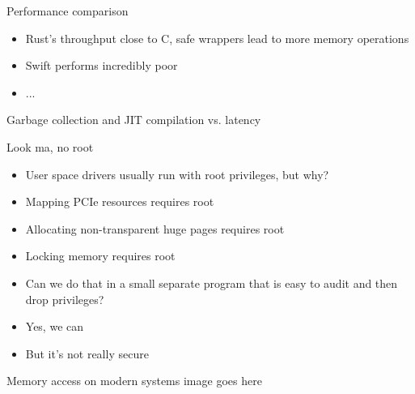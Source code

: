 \documentclass[NET,english,aspectratio=169,notitleframe]{tumbeamer}
\begin{document}
\begin{frame}{Performance comparison}
\begin{itemize}
\item Rust's throughput close to C, safe wrappers lead to more memory operations
\item Swift performs incredibly poor
\item ...
\end{itemize}
\end{frame}

\begin{frame}{Garbage collection and JIT compilation vs. latency}
\end{frame}

\begin{frame}{Look ma, no root}
\begin{itemize}
\item User space drivers usually run with root privileges, but why?
\pause
\vspace{1em}
\item Mapping PCIe resources requires root
\item Allocating non-transparent huge pages requires root
\item Locking memory requires root
\vspace{1em}
\item Can we do that in a small separate program that is easy to audit and then drop privileges?
\pause
\item Yes, we can
\item But it's not really secure
\end{itemize}
\end{frame}

\begin{frame}{Memory access on modern systems}
image goes here
\end{frame}
\end{document}
